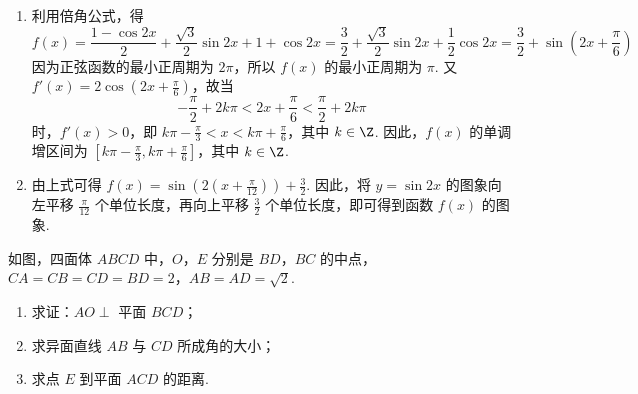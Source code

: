 \begin{solution}
\begin{enumerate}
\item 利用倍角公式，得
\[
f(x)=\frac{1-\cos 2x}{2}+\frac{\sqrt{3}}{2}\sin 2x+1+\cos 2x
=\frac{3}{2}+\frac{\sqrt{3}}{2}\sin 2x+\frac{1}{2}\cos 2x
=\frac{3}{2}+\sin\left(2x+\frac{\pi}{6}\right)
\]
因为正弦函数的最小正周期为 \(2\pi\)，所以 \(f(x)\) 的最小正周期为 \(\pi\). 又 \(f'(x)=2\cos\left(2x+\frac{\pi}{6}\right)\)，故当
\[
-\frac{\pi}{2}+2k\pi<2x+\frac{\pi}{6}<\frac{\pi}{2}+2k\pi
\]
时，\(f'(x)>0\)，即 \(k\pi-\frac{\pi}{3}<x<k\pi+\frac{\pi}{6}\)，其中 \(k\in\Z\). 因此，\(f(x)\) 的单调增区间为 \(\left[k\pi-\frac{\pi}{3},k\pi+\frac{\pi}{6}\right]\)，其中 \(k\in\Z\).
\item 由上式可得 \(f(x)=\sin\left(2\left(x+\frac{\pi}{12}\right)\right)+\frac{3}{2}\). 因此，将 \(y=\sin 2x\) 的图象向左平移 \(\frac{\pi}{12}\) 个单位长度，再向上平移 \(\frac{3}{2}\) 个单位长度，即可得到函数 \(f(x)\) 的图象.
\end{enumerate}
\end{solution}

\begin{problem}
如图，四面体 \(ABCD\) 中，\(O\)，\(E\) 分别是 \(BD\)，\(BC\) 的中点，\(CA = CB = CD = BD = 2\)，\(AB = AD = \sqrt{2}\).
\begin{enumerate}
\item 求证：\(AO \perp\) 平面 \(BCD\)；
\item 求异面直线 \(AB\) 与 \(CD\) 所成角的大小；
\item 求点 \(E\) 到平面 \(ACD\) 的距离.
\end{enumerate}

\end{problem}

